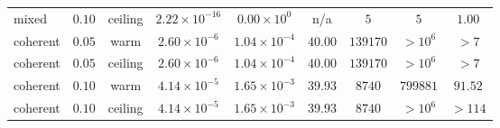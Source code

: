 \documentclass[10pt,a4paper]{article}
\begin{document}
\begin{longtable}{llccccccc}
mixed & $0.10$ & ceiling & $2.22\times 10^{-16}$ & $0.00\times 10^{0}$ & n/a & $5$ & $5$ & $1.00$ \\
coherent & $0.05$ & warm & $2.60\times 10^{-6}$ & $1.04\times 10^{-4}$ & $40.00$ & $139170$ & $>10^{6}$ & $>7$ \\
coherent & $0.05$ & ceiling & $2.60\times 10^{-6}$ & $1.04\times 10^{-4}$ & $40.00$ & $139170$ & $>10^{6}$ & $>7$ \\
coherent & $0.10$ & warm & $4.14\times 10^{-5}$ & $1.65\times 10^{-3}$ & $39.93$ & $8740$ & $799881$ & $91.52$ \\
coherent & $0.10$ & ceiling & $4.14\times 10^{-5}$ & $1.65\times 10^{-3}$ & $39.93$ & $8740$ & $>10^{6}$ & $>114$ \\
\bottomrule\end{longtable}
\end{document}
